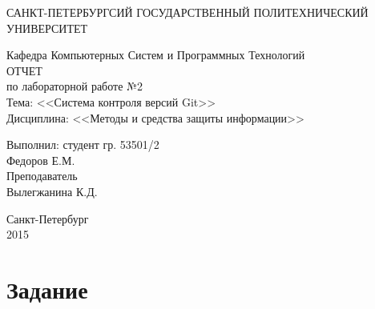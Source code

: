 \documentclass[utf8x, 12pt]{G7-32}
\begin{document}
\frontmatter 


\begin{center} 

\large САНКТ-ПЕТЕРБУРГСИЙ ГОСУДАРСТВЕННЫЙ ПОЛИТЕХНИЧЕСКИЙ УНИВЕРСИТЕТ

\large Кафедра Компьютерных Систем и Программных Технологий \\[5.5cm] 

\huge ОТЧЕТ \\[0.6cm] %
\large по лабораторной работе №2\\
\large Тема: <<Система контроля версий Git>>\\
\large Дисциплина: <<Методы и средства защиты информации>>\\[3.7cm]

\end{center} 

\begin{flushright}
Выполнил: студент гр. 53501/2 \\
Федоров Е.М. \\[1.2cm]


Преподаватель \\
Вылегжанина К.Д.
\end{flushright}


\vfill 

\begin{center} 
\large Санкт-Петербург \\
2015
\end{center} 

\thispagestyle{empty}



\thispagestyle{empty}
\setcounter{page}{0}
\tableofcontents
\clearpage
\mainmatter


\chapter{Задание}
\end{document}
